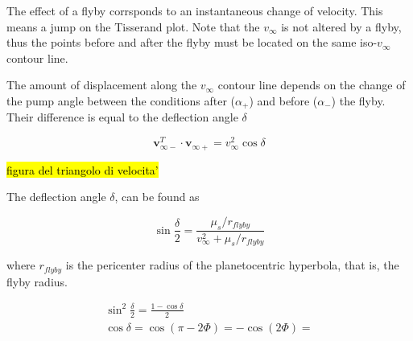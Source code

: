 \documentclass{article}
\newcommand{\vinf}{v_\infty}
\begin{document}
The effect of a flyby corrsponds to an instantaneous change of velocity.
This means a jump on the Tisserand plot.
Note that the $\vinf$ is not altered by a flyby, thus the points before and after the flyby must be located on the same iso-$\vinf$ contour line.

The amount of displacement along the  $\vinf$ contour line depends on the change of the pump angle between the conditions after ($\alpha_+$) and before ($\alpha_-$) the flyby.
Their difference is equal to the deflection angle $\delta$

\begin{equation}
    \bm{v}_{\infty-}^T \cdot \bm{v}_{\infty+} = \vinf^2 \cos\delta
\end{equation}

\hl{figura del triangolo di velocita'}

The deflection angle $\delta$, can be found as

\begin{equation}
    \sin\frac{\delta}{2} = \frac{\mu_s/r_{flyby}}{\vinf^2+\mu_s/r_{flyby}}
\end{equation}

where $r_{flyby}$ is the pericenter radius of the planetocentric hyperbola, that is, the flyby radius.




\begin{align}
    \sin^2\frac{\delta}{2} = { \frac{1-\cos\delta}{2}} \\
    \cos\delta = \cos(\pi-2\Phi) = -\cos(2\Phi) =          \\
\end{align}
\end{document}
